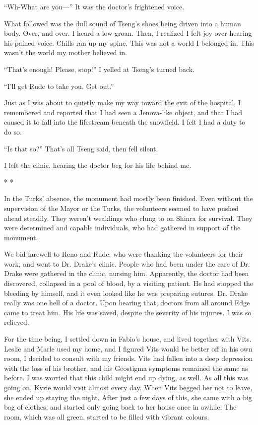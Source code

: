 \documentclass[oneside]{book}
\begin{document}
“Wh-What are you—” It was the doctor’s frightened voice.

What followed was the dull sound of Tseng’s shoes being driven into a human body. Over, and over. I heard a low groan. Then, I realized I felt joy over hearing his pained voice. Chills ran up my spine. This was not a world I belonged in. This wasn’t the world my mother believed in.

“That’s enough! Please, stop!” I yelled at Tseng’s turned back.

“I’ll get Rude to take you. Get out.”

Just as I was about to quietly make my way toward the exit of the hospital, I remembered and reported that I had seen a Jenova-like object, and that I had caused it to fall into the lifestream beneath the snowfield. I felt I had a duty to do so.

“Is that so?” That’s all Tseng said, then fell silent.

I left the clinic, hearing the doctor beg for his life behind me.

* *

In the Turks’ absence, the monument had mostly been finished. Even without the supervision of the Mayor or the Turks, the volunteers seemed to have pushed ahead steadily. They weren’t weaklings who clung to on Shinra for survival. They were determined and capable individuals, who had gathered in support of the monument.

We bid farewell to Reno and Rude, who were thanking the volunteers for their work, and went to Dr. Drake’s clinic. People who had been under the care of Dr. Drake were gathered in the clinic, nursing him. Apparently, the doctor had been discovered, collapsed in a pool of blood, by a visiting patient. He had stopped the bleeding by himself, and it even looked like he was preparing sutures. Dr. Drake really was one hell of a doctor. Upon hearing that, doctors from all around Edge came to treat him. His life was saved, despite the severity of his injuries. I was so relieved.

For the time being, I settled down in Fabio’s house, and lived together with Vits. Leslie and Marle used my home, and I figured Vits would be better off in his own room, I decided to consult with my friends. Vits had fallen into a deep depression with the loss of his brother, and his Geostigma symptoms remained the same as before. I was worried that this child might end up dying, as well. As all this was going on, Kyrie would visit almost every day. When Vits begged her not to leave, she ended up staying the night. After just a few days of this, she came with a big bag of clothes, and started only going back to her house once in awhile. The room, which was all green, started to be filled with vibrant colours.
\end{document}
